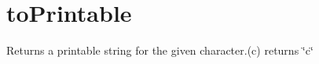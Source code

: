 \hypertarget{toPrintable-example}{}\section{to\+Printable}
Returns a printable string for the given character.(\textquotesingle{}c\textquotesingle{}) returns \char`\"{}c\char`\"{}


\begin{DoxyCodeInclude}
\end{DoxyCodeInclude}
 